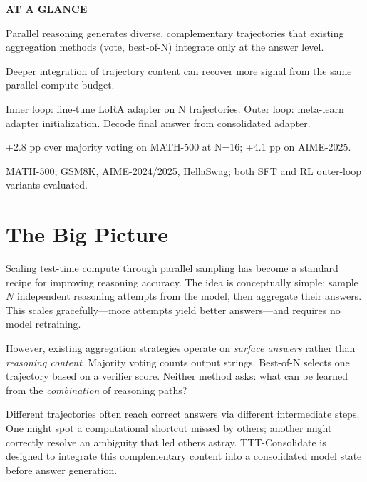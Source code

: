 \documentclass[10pt,twocolumn]{article}
\begin{document}
\begin{mdframed}[backgroundcolor=boxgray,linecolor=rulered,linewidth=1pt,
    innerleftmargin=6pt,innerrightmargin=6pt,
    innertopmargin=6pt,innerbottommargin=6pt]
\textbf{\small AT A GLANCE}\par\vspace{4pt}
\begin{description}[leftmargin=0pt,labelsep=4pt,itemsep=2pt,parsep=0pt,
    font=\small\bfseries]
  \item[Problem:] Parallel reasoning generates diverse, complementary trajectories that existing aggregation methods (vote, best-of-N) integrate only at the answer level.
  \item[Why it matters:] Deeper integration of trajectory content can recover more signal from the same parallel compute budget.
  \item[Method:] Inner loop: fine-tune LoRA adapter on N trajectories. Outer loop: meta-learn adapter initialization. Decode final answer from consolidated adapter.
  \item[Result:] +2.8 pp over majority voting on MATH-500 at N=16; +4.1 pp on AIME-2025.
  \item[Evidence:] MATH-500, GSM8K, AIME-2024/2025, HellaSwag; both SFT and RL outer-loop variants evaluated.
\end{description}
\end{mdframed}

\section{The Big Picture}

Scaling test-time compute through parallel sampling has become a standard recipe for improving reasoning accuracy.
The idea is conceptually simple: sample $N$ independent reasoning attempts from the model, then aggregate their answers.
This scales gracefully---more attempts yield better answers---and requires no model retraining.

However, existing aggregation strategies operate on \emph{surface answers} rather than \emph{reasoning content}.
Majority voting counts output strings.
Best-of-N selects one trajectory based on a verifier score.
Neither method asks: what can be learned from the \emph{combination} of reasoning paths?

Different trajectories often reach correct answers via different intermediate steps.
One might spot a computational shortcut missed by others; another might correctly resolve an ambiguity that led others astray.
TTT-Consolidate is designed to integrate this complementary content into a consolidated model state before answer generation.
\end{document}
